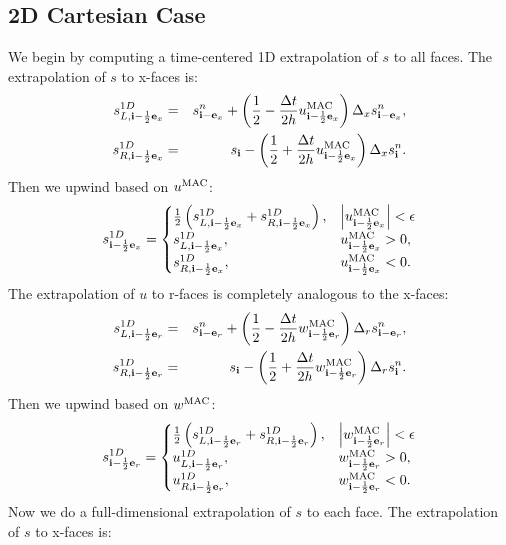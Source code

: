 \documentclass[11pt]{article}
\def\half  {\frac{1}{2}}
\def\dt    {\Delta t}
\def\mac   {\rm MAC}
\def\eb    {{\bf e}}
\def\ib    {{\bf i}}
\begin{document}
\subsection{2D Cartesian Case}
We begin by computing a time-centered 1D extrapolation of $s$ to all faces.  The extrapolation of $s$ to x-faces is:
\begin{eqnarray}
s_{L,\ib-\half\eb_x}^{1D} &=& s_{\ib-\eb_x}^n + \left(\half - \frac{\dt}{2h}u_{\ib-\half\eb_x}^{\mac}\right)\Delta_x s_{\ib-\eb_x}^n, \\
s_{R,\ib-\half\eb_x}^{1D} &=& s_{\ib} - \left(\half + \frac{\dt}{2h}u_{\ib-\half\eb_x}^{\mac}\right)\Delta_x s_{\ib}^n.
\end{eqnarray}
Then we upwind based on $u^{\mac}$:
\begin{equation}
s_{\ib-\half\eb_x}^{1D} =
\begin{cases}
\half\left(s_{L,\ib-\half\eb_x}^{1D} + s_{R,\ib-\half\eb_x}^{1D}\right), & \left|u^{\mac}_{\ib-\half\eb_x}\right| < \epsilon \\
s_{L,\ib-\half\eb_x}^{1D}, & u^{\mac}_{\ib-\half\eb_x} > 0, \\
s_{R,\ib-\half\eb_x}^{1D}, & u^{\mac}_{\ib-\half\eb_x} < 0. \\
\end{cases}
\end{equation}
The extrapolation of $u$ to r-faces is completely analogous to the x-faces:
\begin{eqnarray}
s_{L,\ib-\half\eb_r}^{1D} &=& s_{\ib-\eb_r}^n + \left(\half - \frac{\dt}{2h}w_{\ib-\half\eb_r}^{\mac}\right)\Delta_r s_{\ib-\eb_r}^n, \\
s_{R,\ib-\half\eb_r}^{1D} &=& s_{\ib} - \left(\half + \frac{\dt}{2h}w_{\ib-\half\eb_r}^{\mac}\right)\Delta_r s_{\ib}^n.
\end{eqnarray}
Then we upwind based on $w^{\mac}$:
\begin{equation}
s_{\ib-\half\eb_r}^{1D} =
\begin{cases}
\half\left(s_{L,\ib-\half\eb_r}^{1D} + s_{R,\ib-\half\eb_r}^{1D}\right), & \left|w^{\mac}_{\ib-\half\eb_r}\right| < \epsilon \\
u_{L,\ib-\half\eb_r}^{1D}, & w^{\mac}_{\ib-\half\eb_r} > 0, \\
u_{R,\ib-\half\eb_r}^{1D}, & w^{\mac}_{\ib-\half\eb_r} < 0. \\
\end{cases}
\end{equation}
Now we do a full-dimensional extrapolation of $s$ to each face.  The extrapolation of $s$ to x-faces is:
\end{document}

